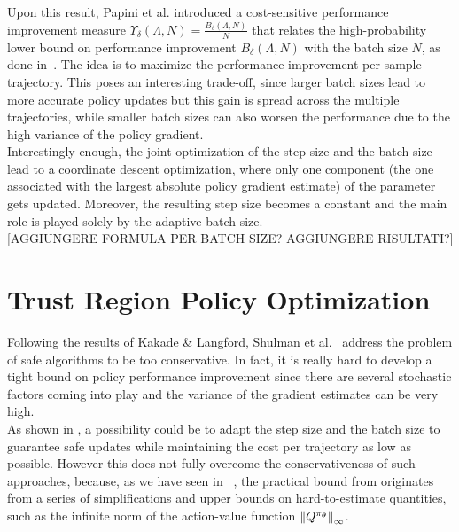 Upon this result, Papini et al. introduced a cost-sensitive performance improvement measure $\Upsilon_\delta(\Lambda, N) = \frac{B_\delta(\Lambda, N)}{N}$ that relates the high-probability lower bound on performance improvement $B_\delta(\Lambda, N)$ with the batch size $N$, as done in~\cite{DBLP:journals/corr/abs-1712-03428}. The idea is to maximize the performance improvement per sample trajectory. This poses an interesting trade-off, since larger batch sizes lead to more accurate policy updates but this gain is spread across the multiple trajectories, while smaller batch sizes can also worsen the performance due to the high variance of the policy gradient.\\
Interestingly enough, the joint optimization of the step size and the batch size lead to a coordinate descent optimization, where only one component (the one associated with the largest absolute policy gradient estimate) of the parameter gets updated. Moreover, the resulting step size becomes a constant and the main role is played solely by the adaptive batch size.\\

[AGGIUNGERE FORMULA PER BATCH SIZE? AGGIUNGERE RISULTATI?]

\section{Trust Region Policy Optimization}
\label{sec:trpo}
Following the results of Kakade \& Langford, Shulman et al.~\cite{trpo} address the problem of safe algorithms to be too conservative. In fact, it is really hard to develop a tight bound on policy performance improvement since there are several stochastic factors coming into play and the variance of the gradient estimates can be very high.\\
As shown in , a possibility could be to adapt the step size and the batch size to guarantee safe updates while maintaining the cost per trajectory as low as possible. However this does not fully overcome the conservativeness of such approaches, because, as we have seen in ~, the practical bound from  originates from a series of simplifications and upper bounds on hard-to-estimate quantities, such as the infinite norm of the action-value function $\norm[\infty]{Q^{\pi_{\vtheta}}}$.


